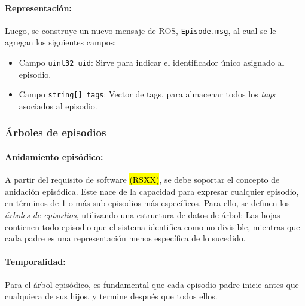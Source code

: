 \paragraph{Representación:}
Luego, se construye un nuevo mensaje de ROS, \texttt{Episode.msg}, al cual se le agregan los siguientes campos:
\begin{itemize}
\item Campo \texttt{uint32 uid}: Sirve para indicar el identificador único asignado al episodio.
\item Campo \texttt{string[] tags}: Vector de tags, para almacenar todos los \textit{tags} asociados al episodio.
\end{itemize}

 
\subsubsection{Árboles de episodios}



\paragraph{Anidamiento episódico:}
A partir del requisito de software \hl{(RSXX)}, se debe soportar el concepto de anidación episódica. Este nace de la capacidad para expresar cualquier episodio, en términos de 1 o más sub-episodios más específicos. Para ello, se definen los \textit{árboles de episodios}, utilizando una estructura de datos de árbol: Las hojas contienen todo episodio que el sistema identifica como no divisible, mientras que cada padre es una representación menos específica de lo sucedido.

\paragraph{Temporalidad:}
Para el árbol episódico, es fundamental que cada episodio padre inicie antes que cualquiera de sus hijos, y termine después que todos ellos. 

